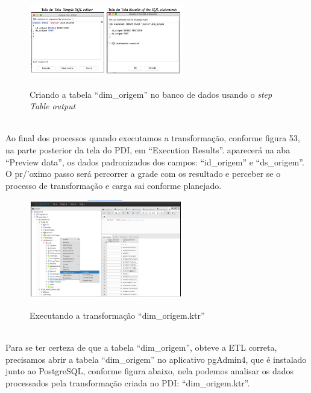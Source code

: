 \begin{figure}[H]
	\vspace*{0,2cm}
    \centering
    \caption{Criando a tabela ``dim\_origem'' no banco de dados usando o \textit{step Table output}}
    \includegraphics[width=0.6\textwidth]{./04-figuras/figura-tb-dim-origem}
    \label{fig:ilustfigtbdimorigem}
\end{figure}
\vspace*{-0,9cm}
{\raggedright {}} \\

Ao final dos processos quando executamos a transforma\c{c}\~{a}o, conforme figura 53, na parte posterior da tela do PDI, em ``Execution Results''. aparecer\'{a} na aba ``Preview data'', os dados padronizados dos campos: ``id\_origem'' e ``ds\_origem''. O pr/'{o}ximo passo ser\'{a} percorrer a grade com os resultado e perceber se o processo de transforma\c{c}\~{a}o e carga sai conforme planejado. 

\begin{figure}[H]
	\vspace*{0,2cm}
    \centering
    \caption{Executando a transforma\c{c}\~{a}o ``dim\_origem.ktr''}
    \includegraphics[width=0.6\textwidth]{./04-figuras/figura-res-tipo-denuncia}
    \label{fig:ilustfigrestipodenuncia}
\end{figure}
\vspace*{-0,9cm}
{\raggedright {}} \\

Para se ter certeza de que a tabela ``dim\_origem'', obteve a ETL correta, precisamos abrir a tabela ``dim\_origem'' no aplicativo pgAdmin4, que \'{e} instalado junto ao PostgreSQL, conforme figura abaixo, nela podemos analisar os dados processados pela transforma\c{c}\~{a}o criada no PDI: ``dim\_origem.ktr''.


